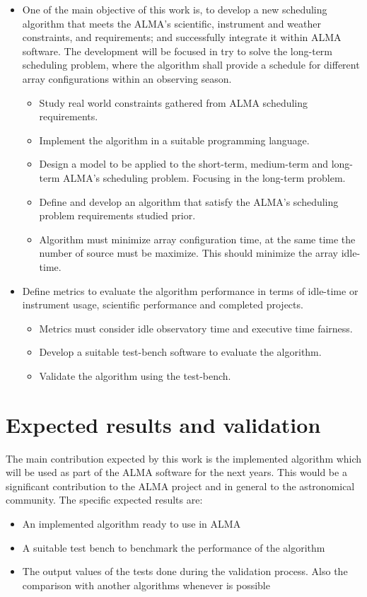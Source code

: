 \begin{itemize}
\item One of the main objective of this work is, to develop a new scheduling algorithm that meets the ALMA’s scientific, instrument and
weather constraints, and requirements; and successfully integrate it within ALMA software.
The development will be focused in try to solve the long-term scheduling problem, where
the algorithm shall provide a schedule for different array configurations within an
observing season.
\begin{itemize}
\item Study real world constraints gathered from ALMA scheduling requirements.
\item Implement the algorithm in a suitable programming language.
\item Design a model to be applied to the short-term, medium-term and long-term ALMA’s
scheduling problem. Focusing in the long-term problem.
\item Define and develop an algorithm that satisfy the ALMA’s scheduling problem requirements
studied prior.
\item Algorithm must minimize array configuration time, at the same time the number of source
must be maximize. This should minimize the array idle-time.
\end{itemize}
\item Define metrics to evaluate the algorithm performance in terms of idle-time or instrument
usage, scientific performance and completed projects.
\begin{itemize}
\item Metrics must consider idle observatory time and executive time fairness.
\item Develop a suitable test-bench software to evaluate the algorithm.
\item Validate the algorithm using the test-bench.
\end{itemize}
\end{itemize}

\section{Expected results and validation}
The main contribution expected by this work is the implemented algorithm which will be used as
part of the ALMA software for the next years. This would be a significant contribution to the
ALMA project and in general to the astronomical community.
The specific expected results are:
\begin{itemize}
\item An implemented algorithm ready to use in ALMA
\item A suitable test bench to benchmark the performance of the algorithm
\item The output values of the tests done during the validation process. Also the comparison with
another algorithms whenever is possible
\end{itemize}

